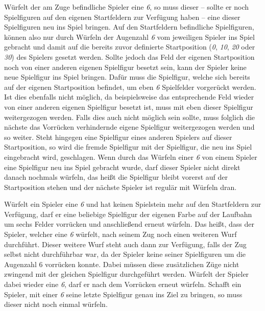 Würfelt der am Zuge befindliche Spieler eine \emph{6}, so muss dieser -- sollte er noch Spielfiguren auf den eigenen Startfeldern zur Verfügung haben -- eine dieser Spielfiguren neu ins Spiel bringen. Auf den Startfeldern befindliche Spielfiguren, können also nur durch Würfeln der Augenzahl \emph{6} vom jeweiligen Spieler ins Spiel gebracht und damit auf die bereits zuvor definierte Startposition (\emph{0}, \emph{10}, \emph{20} oder \emph{30}) des Spielers gesetzt werden. Sollte jedoch das Feld der eigenen Startposition noch von einer anderen eigenen Spielfigur besetzt sein, kann der Spieler keine neue Spielfigur ins Spiel bringen. Dafür muss die Spielfigur, welche sich bereits auf der eigenen Startposition befindet, um eben \emph{6} Spielfelder vorgerückt werden. Ist dies ebenfalls nicht möglich, da beispielsweise das entsprechende Feld wieder von einer anderen eigenen Spielfigur besetzt ist, muss mit eben dieser Spielfigur weitergezogen werden. Falls dies auch nicht möglich sein sollte, muss folglich die nächste das Vorrücken verhindernde eigene Spielfigur weitergezogen werden und so weiter. Steht hingegen eine Spielfigur eines anderen Spielers auf dieser Startposition, so wird die fremde Spielfigur mit der Spielfigur, die neu ins Spiel eingebracht wird, geschlagen. Wenn durch das Würfeln einer \emph{6} von einem Spieler eine Spielfigur neu ins Spiel gebracht wurde, darf dieser Spieler nicht direkt danach nochmals würfeln, das heißt die Spielfigur bleibt vorerst auf der Startposition stehen und der nächste Spieler ist regulär mit Würfeln dran.

Würfelt ein Spieler eine \emph{6} und hat keinen Spielstein mehr auf den Startfeldern zur Verfügung, darf er eine beliebige Spielfigur der eigenen Farbe auf der Laufbahn um sechs Felder vorrücken und anschließend erneut würfeln. Das heißt, dass der Spieler, welcher eine \emph{6} würfelt, nach seinem Zug noch einen weiteren Wurf durchführt. Dieser weitere Wurf steht auch dann zur Verfügung, falls der Zug selbst nicht durchführbar war, da der Spieler keine seiner Spielfiguren um die Augenzahl 6 vorrücken konnte. Dabei müssen diese zusätzlichen Züge nicht zwingend mit der gleichen Spielfigur durchgeführt werden. Würfelt der Spieler dabei wieder eine \emph{6}, darf er nach dem Vorrücken erneut würfeln. Schafft ein Spieler, mit einer \emph{6} seine letzte Spielfigur genau ins Ziel zu bringen, so muss dieser nicht noch einmal würfeln.

